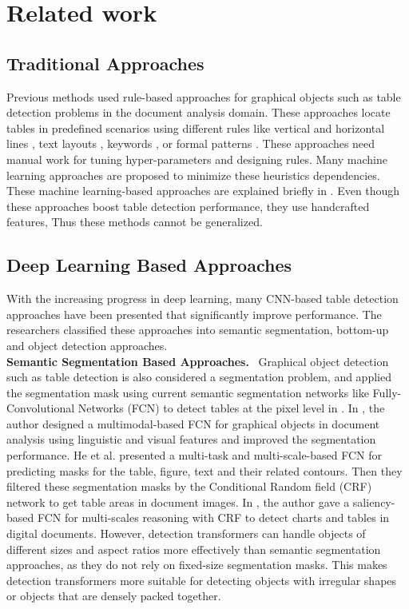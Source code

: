\documentclass[sn-mathphys]{sn-jnl}\jyear{2021}\theoremstyle{thmstyleone}\newtheorem{theorem}{Theorem}\newtheorem{proposition}[theorem]{Proposition}\theoremstyle{thmstyletwo}\newtheorem{example}{Example}\newtheorem{remark}{Remark}\theoremstyle{thmstylethree}\newtheorem{definition}{Definition}\usepackage{amsmath}
\begin{document}
\section{Related work}
\label{sec:related_work}
\subsection{Traditional Approaches}
Previous methods used rule-based approaches for graphical objects such as table detection problems in the document analysis domain. These approaches locate tables in predefined scenarios using different rules like vertical and horizontal lines \cite{Anh56, Gatos876}, text layouts \cite{Kienin67}, keywords \cite{Harit89}, or formal patterns \cite{Yalin78}. These approaches need manual work for tuning hyper-parameters and designing rules. Many machine learning approaches \cite{Cesar38, Silva89} are proposed to minimize these heuristics dependencies. These machine learning-based approaches are explained briefly in \cite{Costa78}. Even though these approaches boost table detection performance, they use handcrafted features, Thus these methods cannot be generalized.   
\subsection{Deep Learning Based Approaches}
With the increasing progress in deep learning, many CNN-based table detection approaches have been presented that significantly improve performance. The researchers classified these approaches into semantic segmentation, bottom-up and object detection approaches.\\  
\noindent\textbf {Semantic Segmentation Based Approaches.}~
Graphical object detection such as table detection is also considered a segmentation problem, and applied the segmentation mask using current semantic segmentation networks like Fully-Convolutional Networks (FCN) \cite{fcn65} to detect tables at the pixel level in \cite{Xiao17, He761, Isaak36}. In \cite{Xiao17}, the author designed a multimodal-based FCN for graphical objects in document analysis using linguistic and visual features and improved the segmentation performance. He et al. \cite{He761} presented a multi-task and multi-scale-based FCN for predicting masks for the table, figure, text and their related contours. Then they filtered these segmentation masks by the Conditional Random field (CRF) network to get table areas in document images. In \cite{Isaak36}, the author gave a saliency-based FCN for multi-scales reasoning with CRF to detect charts and tables in digital documents. However, detection transformers can handle objects of different sizes and aspect ratios more effectively than semantic segmentation approaches, as they do not rely on fixed-size segmentation masks. This makes detection transformers more suitable for detecting objects with irregular shapes or objects that are densely packed together.\\
\end{document}
